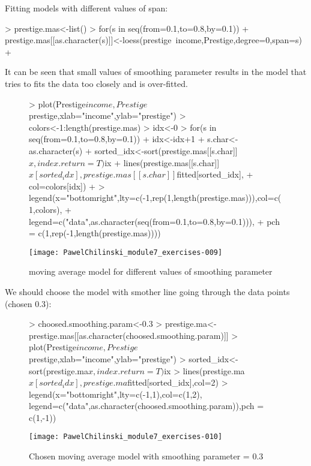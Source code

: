 \documentclass[a4paper]{article}
\begin{document}
\begin{itemize}
Fitting models with different values of span:
\begin{Schunk}
\begin{Sinput}
> prestige.mas<-list()
> for(s in seq(from=0.1,to=0.8,by=0.1)){
+ 	prestige.mas[[as.character(s)]]<-loess(prestige~income,Prestige,degree=0,span=s)	
+ }
\end{Sinput}
\end{Schunk}
It can be seen that small values of smoothing parameter results in the model
that tries to fits the data too closely and is over-fitted. 
\begin{figure}[H]
\begin{center}
\begin{Schunk}
\begin{Sinput}
> plot(Prestige$income,Prestige$prestige,xlab="income",ylab="prestige")
> colors<-1:length(prestige.mas)
> idx<-0
> for(s in seq(from=0.1,to=0.8,by=0.1)){
+ 	idx<-idx+1
+ 	s.char<-as.character(s)
+ 	sorted_idx<-sort(prestige.mas[[s.char]]$x,index.return=T)$ix
+ 	lines(prestige.mas[[s.char]]$x[sorted_idx],prestige.mas[[s.char]]$fitted[sorted_idx],
+ 			col=colors[idx])	
+ }
> legend(x="bottomright",lty=c(-1,rep(1,length(prestige.mas))),col=c(1,colors), 
+ 		legend=c("data",as.character(seq(from=0.1,to=0.8,by=0.1))),
+ 		pch = c(1,rep(-1,length(prestige.mas))))
\end{Sinput}
\end{Schunk}
\texttt{[image: PawelChilinski\_module7\_exercises-009]}
\caption{moving average model for different values of smoothing parameter}
\end{center}
\end{figure}

We should choose the model with smother line going through the data points
(chosen 0.3):
\begin{figure}[H]
\begin{center}
\begin{Schunk}
\begin{Sinput}
> choosed.smoothing.param<-0.3
> prestige.ma<-prestige.mas[[as.character(choosed.smoothing.param)]]
> plot(Prestige$income,Prestige$prestige,xlab="income",ylab="prestige")
> sorted_idx<-sort(prestige.ma$x,index.return=T)$ix
> lines(prestige.ma$x[sorted_idx],prestige.ma$fitted[sorted_idx],col=2)	
> legend(x="bottomright",lty=c(-1,1),col=c(1,2), legend=c("data",as.character(choosed.smoothing.param)),pch = c(1,-1))
\end{Sinput}
\end{Schunk}
\texttt{[image: PawelChilinski\_module7\_exercises-010]}
\caption{Chosen moving average model with smoothing parameter =
0.3}
\end{center}
\end{figure}


\end{itemize}
\end{document}
